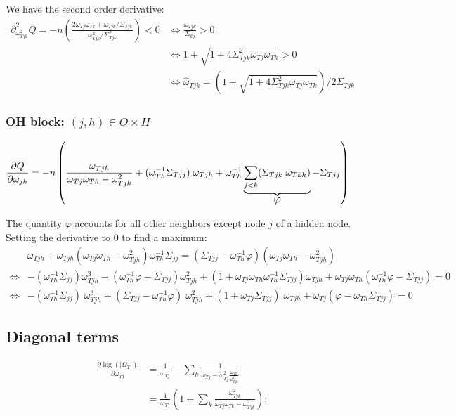 \documentclass[11pt,a4paper]{article}
\begin{document}
We have the second order derivative:
\begin{align*}
\partial^2_{\omega_{Tjk}^2}Q = -n\left(\frac{2\omega_{Tj}\omega_{Tk} + \omega_{Tjk}/\Sigma_{Tjk}}{\omega_{Tjk}^2/\Sigma_{Tjk}^2}\right) <0 &\iff \frac{\omega_{Tjk}}{\Sigma_{kj}}>0\\
& \iff 1 \pm \sqrt{1+4\Sigma_{Tjk}^2\omega_{Tj}\omega_{Tk}} >0\\
&\iff \hat{\omega}_{Tjk} = \left(1 + \sqrt{1+4\Sigma_{Tjk}^2\omega_{Tj}\omega_{Tk}}\right) / 2\Sigma_{Tjk}
\end{align*}


\subsubsection{OH block: $(j,h)\in O\times H$}

\begin{align*}
\frac{\partial Q}{\partial \omega_{jh}}  &= -n\left( \frac{\omega_{Tjh}}{\omega_{Tj}\omega_{Th}-\omega_{Tjh}^2}+(\omega_{Th}^{-1}\Sigma_{Tjj})\;\omega_{Tjh} + \omega_{Th}^{-1}\underbrace{\sum_{j<k}(\Sigma_{Tjk}\;\omega_{Tkh})}_{\text{\large{$\varphi$}}}-\Sigma_{Tjj}\right)
\end{align*}

The quantity $\varphi$ accounts for all other neighbors except node $j$ of a hidden node. 
Setting the derivative to 0 to find a maximum:
\begin{align*}
&\omega_{Tjh} + \omega_{Tjh}(\omega_{Tj}\omega_{Th} - \omega_{Tjh}^2)\omega_{Th}^{-1}\Sigma_{jj} = (\Sigma_{Tjj} - \omega_{Th}^{-1} \varphi)(\omega_{Tj}\omega_{Th} - \omega_{Tjh}^2)\\
\iff & -(\omega_{Th}^{-1} \Sigma_{jj})\omega_{Tjh}^3 - (\omega_{Th}^{-1}\varphi - \Sigma_{Tjj})\omega_{Tjh}^2 + (1+\omega_{Tj}\omega_{Th}\omega_{Th  }^{-1}\Sigma_{Tjj})\omega_{Tjh} + \omega_{Tj}\omega_{Th}(\omega_{Th}^{-1}\varphi - \Sigma_{Tjj}) = 0\\
\iff  & -(\omega_{Th}^{-1} \Sigma_{jj}) \;\omega_{Tjh}^3 + ( \Sigma_{Tjj} - \omega_{Th}^{-1}\varphi)\;\omega_{Tjh}^2 + (1+\omega_{Tj} \Sigma_{Tjj})\;\omega_{Tjh} + \omega_{Tj}(\varphi - \omega_{Th}\Sigma_{Tjj}) = 0
\end{align*}
\subsection{Diagonal terms}
\begin{align*}
\frac{\partial \log(|\Omega_T|)}{\partial \omega_{Tj}} &= \frac{1}{\omega_{Tj}} - \sum_{k} \frac{1}{\omega_{Tj} - \omega_{Tj}^2 \frac{\omega_{Tk}}{\omega_{Tjk}^2}}\\
&= \frac{1}{\omega_{Tj}}\left( 1 + \sum_{k} \frac{\omega_{Tjk} ^2}{\omega_{Tj}\omega_{Tk} - \omega_{Tjk} ^2}  \right);
\end{align*}
\end{document}
